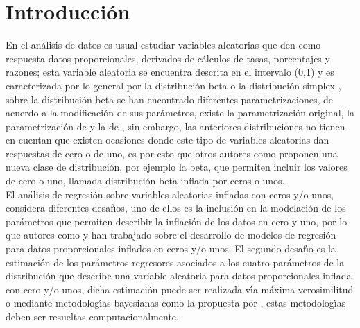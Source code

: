 \chapter{Introducci\'{o}n}


En el an\'{a}lisis de datos es usual estudiar variables aleatorias que den como respuesta datos proporcionales, derivados de c\'{a}lculos de tasas, porcentajes y razones; esta variable aleatoria se encuentra descrita en el intervalo (0,1) y es caracterizada  por lo general por la distribuci\'{o}n beta o la distribuci\'{o}n simplex \citep{Jorgensen1}, sobre la distribuci\'{o}n beta se han encontrado diferentes parametrizaciones, de acuerdo a la modificaci\'{o}n de sus par\'{a}metros, existe la parametrizaci\'{o}n original, la parametrizaci\'{o}n de \cite{Ferrari2} y la de \cite{Stasinopoulos2}, sin embargo, las anteriores distribuciones no tienen en cuentan que existen ocasiones donde este tipo de variables aleatorias dan respuestas de cero o de uno, es por esto que otros autores como \cite{Ospina2} proponen una nueva clase de distribuci\'{o}n, por ejemplo la beta, que permiten incluir los valores de cero o uno, llamada distribuci\'{o}n beta inflada por ceros o unos.\\

El an\'{a}lisis de regresi\'{o}n sobre variables aleatorias infladas con ceros y/o unos, considera diferentes desaf\'{\i}os, uno de ellos es la inclusi\'{o}n en la modelaci\'{o}n de los par\'{a}metros que permiten describir la inflaci\'{o}n de los datos en cero y uno, por lo que autores como \cite{Ospina1} y \cite{Kosmidis1} han trabajado sobre el desarrollo de modelos de regresi\'{o}n para datos proporcionales inflados en ceros y/o unos. El segundo desaf\'{\i}o es la estimaci\'{o}n de los par\'{a}metros regresores asociados a los cuatro par\'{a}metros de la distribuci\'{o}n que describe una variable aleatoria para datos proporcionales inflada con cero y/o unos, dicha estimaci\'{o}n puede ser realizada v\'{\i}a m\'{a}xima verosimilitud \citep{Ospina1} o mediante metodolog\'{\i}as bayesianas como la propuesta por \cite{Galvis1}, estas metodolog\'{\i}as deben ser resueltas computacionalmente.\\

